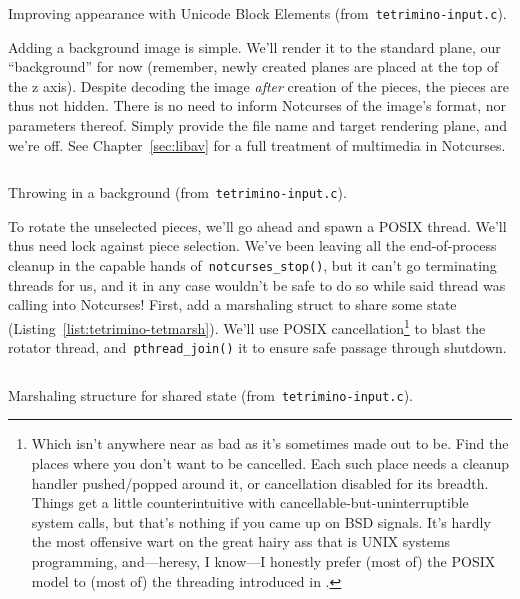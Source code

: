\begin{listing}[!htbp]
\inputminted[]{C}{code/tetrimino-databox.h}
\begin{verbatim}

\end{verbatim}
\inputminted[]{C}{code/tetrimino-displayutf8.h}
\caption{Improving appearance with Unicode Block Elements (from~\texttt{tetrimino-input.c}).}
\label{list:tetrimino-displayutf8}
\end{listing}

Adding a background image is simple. We'll render it to the standard plane, our
``background'' for now (remember, newly created planes are placed at the top of
the z axis). Despite decoding the image \textit{after} creation of the pieces,
the pieces are thus not hidden. There is no need to inform Notcurses of the
image's format, nor parameters thereof. Simply provide the file name and target
rendering plane, and we're off. See Chapter~\ref{sec:libav} for a full treatment
of multimedia in Notcurses.

\begin{listing}[!htbp]
\inputminted[]{C}{code/tetrimino-background.h}
\caption{Throwing in a background (from~\texttt{tetrimino-input.c}).}
\label{list:tetrimino-background}
\end{listing}

To rotate the unselected pieces, we'll go ahead and spawn a POSIX thread. We'll
thus need lock against piece selection. We've been leaving all the end-of-process
cleanup in the capable hands of~\texttt{notcurses\_stop()}, but it can't go
terminating threads for us, and it in any case wouldn't be safe to do so while
said thread was calling into Notcurses! First, add a marshaling struct to share
some state (Listing~\ref{list:tetrimino-tetmarsh}). We'll use POSIX
cancellation\footnote{Which isn't anywhere near as bad as it's sometimes made out to be.
Find the places where you don't want to be cancelled. Each such place needs a
cleanup handler pushed/popped around it, or cancellation disabled for its
breadth. Things get a little counterintuitive with
cancellable-but-uninterruptible system calls, but that's nothing if you came up
on BSD signals. It's hardly the most offensive wart on the great hairy ass
that is UNIX systems programming, and---heresy, I know---I honestly prefer (most of) the
POSIX model to (most of)
the threading introduced in .} to blast the rotator thread, and~\texttt{pthread\_join()}
it to ensure safe passage through shutdown.

\begin{listing}[!htbp]
\inputminted[]{C}{code/tetrimino-tetmarsh.h}
\caption{Marshaling structure for shared state (from~\texttt{tetrimino-input.c}).}
\label{list:tetrimino-tetmarsh}
\end{listing}


